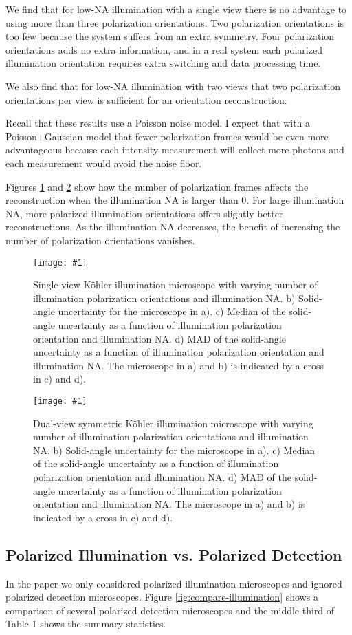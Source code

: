 \documentclass[11pt]{article}
\providecommand{\fig}[4]{
\begin{figure}[h]
 \captionsetup{width=1.0\linewidth}
 \centering
 \texttt{[image: \#1]}
 \caption{#3}
 \label{fig:#4}
\end{figure}
}
\begin{document}
We find that for low-NA illumination with a single view there is no advantage to
using more than three polarization orientations. Two polarization orientations
is too few because the system suffers from an extra symmetry. Four polarization
orientations adds no extra information, and in a real system each polarized
illumination orientation requires extra switching and data processing time.

We also find that for low-NA illumination with two views that two polarization
orientations per view is sufficient for an orientation reconstruction.

Recall that these results use a Poisson noise model. I expect that with a
Poisson+Gaussian model that fewer polarization frames would be even more
advantageous because each intensity measurement will collect more photons and
each measurement would avoid the noise floor.

Figures \ref{fig:ill-pol} and \ref{fig:ill-pol-ortho} show how the number of
polarization frames affects the reconstruction when the illumination NA is
larger than 0. For large illumination NA, more polarized illumination
orientations offers slightly better reconstructions. As the illumination NA
decreases, the benefit of increasing the number of polarization orientations
vanishes.

\fig{../figures/ill-polarization.pdf}{1.0}{Single-view K\"ohler illumination
  microscope with varying number of illumination polarization orientations and
  illumination NA. b) Solid-angle uncertainty for the microscope in a). c)
  Median of the solid-angle uncertainty as a function of illumination
  polarization orientation and illumination NA. d) MAD of the solid-angle
  uncertainty as a function of illumination polarization orientation and
  illumination NA. The microscope in a) and b) is indicated by a cross in c) and
  d).}{ill-pol}

\fig{../figures/ill-polarization-ortho.pdf}{1.0}{Dual-view symmetric K\"ohler
  illumination microscope with varying number of illumination polarization
  orientations and illumination NA. b) Solid-angle uncertainty for the
  microscope in a). c) Median of the solid-angle uncertainty as a function of
  illumination polarization orientation and illumination NA. d) MAD of the
  solid-angle uncertainty as a function of illumination polarization orientation
  and illumination NA. The microscope in a) and b) is indicated by a cross in c)
  and d).}{ill-pol-ortho}

\subsection{Polarized Illumination vs. Polarized Detection}
In the paper we only considered polarized illumination microscopes and ignored
polarized detection microscopes. Figure \ref{fig:compare-illumination} shows a
comparison of several polarized detection microscopes and the middle third of
Table 1 shows the summary statistics.
\end{document}
